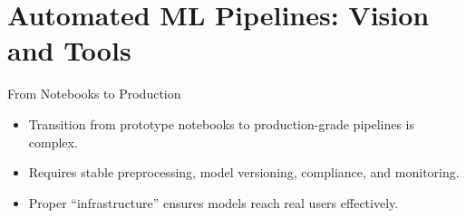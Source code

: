 \documentclass[aspectratio=169]{beamer}
\begin{document}
\section{Automated ML Pipelines: Vision and Tools}

\begin{frame}{From Notebooks to Production}
\begin{itemize}
\item Transition from prototype notebooks to production-grade pipelines is complex.
\item Requires stable preprocessing, model versioning, compliance, and monitoring.
\item Proper “infrastructure” ensures models reach real users effectively.
\end{itemize}
\end{frame}
\end{document}
